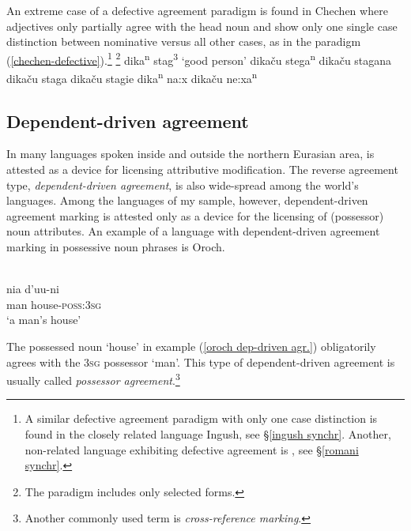 An extreme case of a defective agreement paradigm is found in Chechen where adjectives only partially agree with the head noun and show only one single case distinction between nominative versus all other cases, as in the paradigm (\ref{chechen-defective}).\footnote{A similar defective agreement paradigm with only one case distinction is found in the closely related language Ingush, see \S\ref{ingush synchr}. Another, non-related language exhibiting defective agreement is , see \S\ref{romani synchr}.}
\ea
\label{chechen-defective}
{}\footnote{The paradigm includes only selected forms.}
\ea dika\textsuperscript{n} stag\textsuperscript{3} \rm{‘good person’}		
\ex dikaču stega\textsuperscript{n} 								
\ex dikaču stagana 											
\ex dikaču staga 											
\ex dikaču stagie											
\ex dika\textsuperscript{n} na:x									
\ex dikaču ne:xa\textsuperscript{n}								
\zl
{}

\subsection{Dependent\hyp{}driven agreement}
In many languages spoken inside and outside the northern Eurasian area,  is attested as a device for licensing attributive modification. The reverse agreement type, \emph{dependent\hyp{}driven agreement}, is also wide-spread among the world's languages. Among the languages of my sample, however, dependent\hyp{}driven agreement marking is attested only as a device for the licensing of (possessor) noun attributes. An example of a language with dependent\hyp{}driven agreement marking in possessive noun phrases is Oroch.
\begin{exe}
\ex
\label{oroch dep-driven agr.}
\\
\gll 	nia	d'uu-ni\\
	man	house-\textsc{poss:3sg}\\
\glt	‘a man's house’
\end{exe}
The possessed noun ‘house’ in example (\ref{oroch dep-driven agr.}) obligatorily agrees with the \textsc{3sg} possessor ‘man’. This type of dependent\hyp{}driven agreement is usually called \emph{possessor agreement}.\footnote{Another commonly used term is \emph{cross-reference marking}.}

